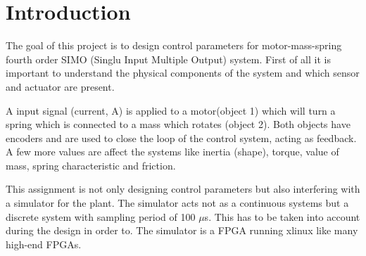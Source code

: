 \section{Introduction}
The goal of this project is to design control parameters for motor-mass-spring fourth order SIMO (Singlu Input Multiple Output) system. First of all it is important to understand the physical components of the system and which sensor and actuator are present.

A input signal (current, A) is applied to a motor(object 1) which will turn a spring which is connected to a mass which rotates (object 2). Both objects have encoders and are used to close the loop of the control system, acting as feedback. A few more values are affect the systems like inertia (shape), torque, value of mass, spring characteristic and friction.

This assignment is not only designing control parameters but also interfering with a simulator for the plant. The simulator acts not as a continuous systems but a discrete system with sampling period of 100 $\mu$s. This has to be taken into account during the design in order to. The simulator is a FPGA running xlinux like many high-end FPGAs. 




